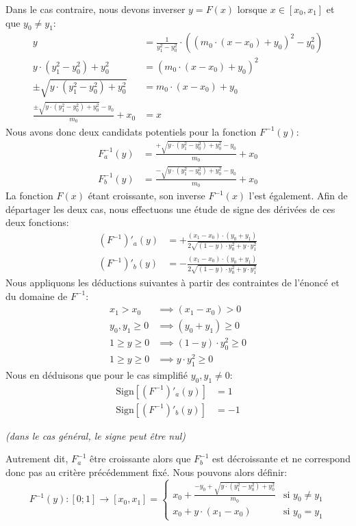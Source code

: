 \documentclass[a4paper,11pt]{report}
\begin{document}
Dans le cas contraire, nous devons inverser $y = F(x)$ lorsque $x \in [x_0, x_1]$ et que $y_0 \ne y_1$:
\begingroup
\addtolength{\jot}{1em}
\begin{align*}
	y &= \frac{1}{y^2_1 - y^2_0} \cdot \left( \left( m_0 \cdot  \left( x - x_0 \right) + y_0 \right)^2 - y^2_0 \right) \\
	y \cdot (y_1^2 - y_0^2) + y^2_0 &=  \left( m_0 \cdot  \left( x - x_0 \right) + y_0 \right)^2\\
	\pm \sqrt{y \cdot (y_1^2 - y_0^2) + y^2_0} &=  m_0 \cdot  \left( x - x_0 \right) + y_0 \\
	\frac{\pm \sqrt{y \cdot (y_1^2 - y_0^2) + y^2_0} - y_0}{m_0} + x_0 &=  x
\end{align*}
\endgroup
Nous avons donc deux candidats potentiels pour la fonction $F^{-1}(y)$:
\begin{align*}
	F^{-1}_a(y) &= \frac{+\sqrt{y \cdot (y_1^2 - y_0^2) + y^2_0} - y_0}{m_0} + x_0 \\
	F^{-1}_b(y) &= \frac{-\sqrt{y \cdot (y_1^2 - y_0^2) + y^2_0} - y_0}{m_0} + x_0
\end{align*}
La fonction $F(x)$ étant croissante, son inverse $F^{-1}(x)$ l'est également. Afin de départager les deux cas, nous effectuons une étude de signe des dérivées de ces deux fonctions:
\begin{align*}
(F^{-1})'_a(y) &= +\frac{(x_1-x_0) \cdot (y_0+y_1)}{2 \sqrt{(1-y) \cdot y_0^2+y \cdot y_1^2}} \\
(F^{-1})'_b(y) &= -\frac{(x_1-x_0) \cdot (y_0+y_1)}{2 \sqrt{(1-y) \cdot y_0^2+y \cdot y_1^2}}
\end{align*}
Nous appliquons les déductions suivantes à partir des contraintes de l'énoncé et du domaine de $F^{-1}$:
\begin{align*}
	x_1 > x_0 &\implies (x_1-x_0) > 0 \\
	y_0, y_1 \ge 0 &\implies (y_0+y_1) \ge 0 \\
	1 \ge y \ge 0 &\implies (1-y) \cdot y_0^2 \ge 0 \\
	1 \ge y \ge 0 &\implies y \cdot y_1^2 \ge 0
\end{align*}
Nous en déduisons que pour le cas simplifié $y_0,y_1 \ne 0$:
\begin{align*}
\text{Sign}\left[(F^{-1})'_a(y)\right] &= 1 \\
\text{Sign}\left[(F^{-1})'_b(y)\right] &= -1
\end{align*}
\begin{center}
	\emph{(dans le cas général, le signe peut être nul)}
\end{center}
Autrement dit, $F^{-1}_a$ être croissante alors que $F^{-1}_b$ est décroissante et ne correspond donc pas au critère précédemment fixé. Nous pouvons alors définir:
\begin{equation*}
	F^{-1}(y): [0;1] \rightarrow [x_0,x_1] = \left\lbrace \begin{array}{ll}
		x_0 + \frac{- y_0 + \sqrt{y \cdot (y_1^2 - y_0^2) + y^2_0}}{m_0}
		& \text{si $y_0 \ne y_1$} \\
		x_0 + y \cdot (x_1 - x_0)
		& \text{si $y_0 = y_1$}
	\end{array} \right.
\end{equation*}
\end{document}

